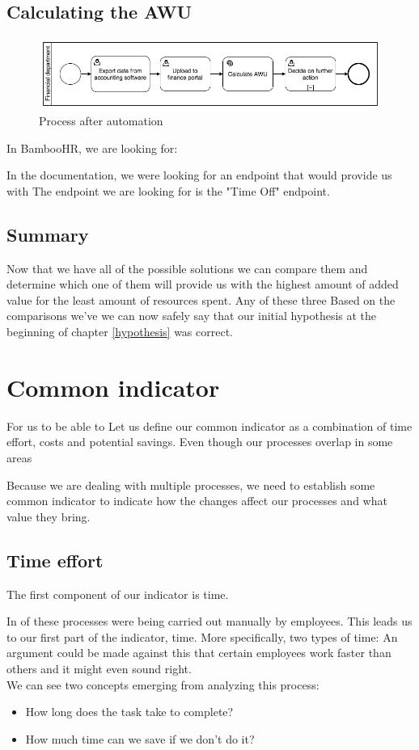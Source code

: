 \documentclass[12pt,oneside]{fithesis2}
\begin{document}
\section{Calculating the AWU}

\begin{figure}[ht]
    \centering
    \includegraphics[width=\textwidth]{after_automation.png}
    \caption{Process after automation}
    \label{fig:after_automation}
\end{figure}

In BambooHR, we are looking for: 

In the documentation, we were looking for an endpoint that would provide us with 
The endpoint we are looking for is the "Time Off" endpoint.

\section{Summary}
Now that we have all of the possible solutions we can compare them and determine which one of them will provide us with the highest amount of added value for the least amount of resources spent. Any of these three 
Based on the comparisons we've we can now safely say that our initial hypothesis at the beginning of chapter \ref{hypothesis} was correct.

\chapter{Common indicator}
For us to be able to 
Let us define our common indicator as a combination of time effort, costs and potential savings.
Even though our processes overlap in some areas

Because we are dealing with multiple processes, we need to establish some common indicator to indicate how the changes affect our processes and what value they bring.

\section*{Time effort}
The first component of our indicator is time. 


In of these processes were being carried out manually by employees. This leads us to our first part of the indicator, time.
More specifically, two types of time:
An argument could be made against this that certain employees work faster than others and it might even sound right.
~\\\newline
We can see two concepts emerging from analyzing this process:
\begin{itemize}
    \setlength\itemsep{0em}
    \item How long does the task take to complete?
    \item How much time can we save if we don't do it?
\end{itemize}
 
\end{document}
